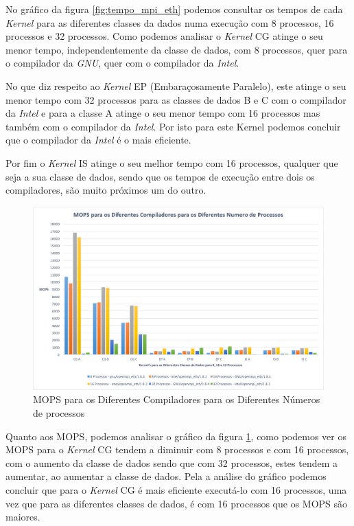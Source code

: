 \documentclass[conference,compsoc]{IEEEtran}
\begin{document}
No gráfico da figura \ref{fig:tempo_mpi_eth} podemos consultar os tempos de cada \textit{Kernel} para as diferentes classes da dados numa execução com 8 processos, 16 processos e 32 processos. Como podemos analisar o \textit{Kernel} CG atinge o seu menor tempo, independentemente da classe de dados, com 8 processos, quer para o compilador da \textit{GNU}, quer com o compilador da \textit{Intel}. 

No que diz respeito ao \textit{Kernel} EP (Embaraçosamente Paralelo), este atinge o seu menor tempo com 32 processos para as classes de dados B e C com o compilador da \textit{Intel} e para a classe A atinge o seu menor tempo com 16 processos mas também com o compilador da \textit{Intel}. Por isto para este Kernel podemos concluir que o compilador da \textit{Intel} é o mais eficiente.

Por fim o \textit{Kernel} IS atinge o seu melhor tempo com 16 processos, qualquer que seja a sua classe de dados, sendo que os tempos de execução entre dois os compiladores, são muito próximos um do outro.

\begin{figure}[h!]
\centering
\includegraphics[scale=0.325]{MPI/mops_dif_compiladores_dif_num_proc.png}
\caption{MOPS para os Diferentes Compiladores para os Diferentes Números de processos}
\label{fig:mops_mpi_eth}
\end{figure}

Quanto aos MOPS, podemos analisar o gráfico da figura \ref{fig:mops_mpi_eth}, como podemos ver os MOPS para o \textit{Kernel} CG tendem a diminuir com 8 processos e com 16 processos, com o aumento da classe de dados sendo que com 32 processos, estes tendem a aumentar, ao aumentar a classe de dados. Pela a análise do gráfico podemos concluir que para o \textit{Kernel} CG é mais eficiente executá-lo com 16 processos, uma vez que para as diferentes classes de dados, é com 16 processos que os MOPS são maiores.
\end{document}
